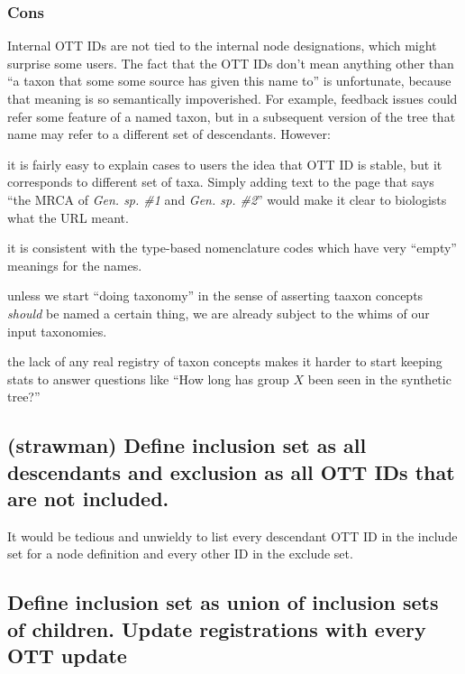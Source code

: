 \documentclass[11pt]{article}
\begin{document}
\subsubsection{Cons}
\begin{compactenum}
  \item Internal OTT IDs are not tied to the internal node designations, which might surprise
  some users.
  The fact that the OTT IDs don't mean anything other than ``a taxon that some
  some source has given this name to'' is unfortunate, because that meaning is so 
  semantically impoverished.
  For example, feedback issues could refer some feature of a named taxon, but in 
    a subsequent version of the tree that name may refer to a different set of 
    descendants.
  However:
  \begin{compactenum}
    \item it is fairly easy to explain cases to users the idea that OTT ID is stable,
    but it corresponds to different set of taxa.
    Simply adding text to the page that says ``the MRCA of {\em Gen. sp. \#1} and {\em Gen. sp. \#2}'' would make it clear to biologists what the URL meant.
    \item it is consistent with the type-based nomenclature codes which have
    very ``empty'' meanings for the names.
    \item unless we start ``doing taxonomy'' in the sense of asserting taaxon concepts
    {\em should} be named a certain thing, we are already subject to the whims
    of our input taxonomies.
  \end{compactenum}
  \item the lack of any real registry of taxon concepts makes it harder to
  start keeping stats to answer questions like ``How long has group $X$ been
  seen in the synthetic tree?''
\end{compactenum}

\subsection{(strawman) Define inclusion set as all descendants and exclusion as all 
OTT IDs that are not included.}
It would be tedious and unwieldy to list every descendant OTT ID in the include
  set for a node definition and every other ID in the exclude set.


\subsection{Define inclusion set as union of inclusion sets of children.
Update registrations with every OTT update}
\end{document}
